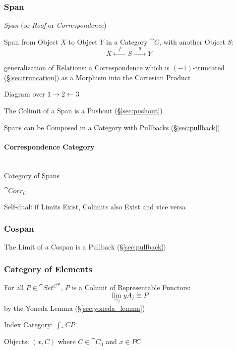 \subsubsection{Span}\label{sec:span}

\emph{Span} (or \emph{Roof} or \emph{Correspondence})

Span from Object $X$ to Object $Y$ in a Category $\cat{C}$, with
another Object $S$:
\[
  X \xleftarrow{\quad f \quad} S \xrightarrow{\quad g \quad} Y
\]

generalization of Relations: a Correspondence which is
$(-1)$-truncated (\S\ref{sec:truncation}) as a Morphism into the
Cartesian Product

Diagram over $1 \rightarrow 2 \leftarrow 3$

The Colimit of a Span is a Pushout (\S\ref{sec:pushout})

Spans can be Composed in a Category with Pullbacks
(\S\ref{sec:pullback})



\paragraph{Correspondence Category}\label{sec:correspondence_category}
\hfill \\

Category of Spans

$\cat{Corr_C}$

Self-dual: if Limits Exist, Colimits also Exist and vice versa



\subsubsection{Cospan}\label{sec:cospan}

The Limit of a Cospan is a Pullback (\S\ref{sec:pullback})



\subsubsection{Category of Elements}\label{sec:element_category}

For all $P \in \cat{Set^{C^{op}}}$, $P$ is a Colimit of
Representable Functors:
\[
  \lim_{\rightarrow_j} yA_j \cong P
\]
by the Yoneda Lemma (\S\ref{sec:yoneda_lemma})

Index Category: $\int_\cat{C} P$

Objects: $(x,C)$ where $C \in \cat{C}_0$ and $x \in PC$

